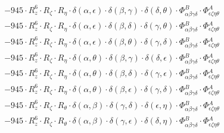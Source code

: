 \documentclass{article}
\begin{document}
\begin{equation}
\begin{array}{c}
 \\[0.2em] 		 - 945 \cdot R_{z}^{6} \cdot R_{\zeta{}} \cdot R_{\eta{}} \cdot \delta{}\left(\alpha{}, \epsilon{}\right) \cdot \delta{}\left(\beta{}, \gamma{}\right) \cdot \delta{}\left(\delta{}, \theta{}\right) \cdot \Phi{}^{B}_{\alpha{}\beta{}\gamma{}\delta{}} \cdot \Phi{}^{A}_{\epsilon{}\zeta{}\eta{}\theta{}} 
 \\[0.2em] 		 - 945 \cdot R_{z}^{6} \cdot R_{\zeta{}} \cdot R_{\eta{}} \cdot \delta{}\left(\alpha{}, \epsilon{}\right) \cdot \delta{}\left(\beta{}, \delta{}\right) \cdot \delta{}\left(\gamma{}, \theta{}\right) \cdot \Phi{}^{B}_{\alpha{}\beta{}\gamma{}\delta{}} \cdot \Phi{}^{A}_{\epsilon{}\zeta{}\eta{}\theta{}} 
 \\[0.2em] 		 - 945 \cdot R_{z}^{6} \cdot R_{\zeta{}} \cdot R_{\eta{}} \cdot \delta{}\left(\alpha{}, \epsilon{}\right) \cdot \delta{}\left(\beta{}, \theta{}\right) \cdot \delta{}\left(\gamma{}, \delta{}\right) \cdot \Phi{}^{B}_{\alpha{}\beta{}\gamma{}\delta{}} \cdot \Phi{}^{A}_{\epsilon{}\zeta{}\eta{}\theta{}} 
 \\[0.2em] 		 - 945 \cdot R_{z}^{6} \cdot R_{\zeta{}} \cdot R_{\eta{}} \cdot \delta{}\left(\alpha{}, \theta{}\right) \cdot \delta{}\left(\beta{}, \gamma{}\right) \cdot \delta{}\left(\delta{}, \epsilon{}\right) \cdot \Phi{}^{B}_{\alpha{}\beta{}\gamma{}\delta{}} \cdot \Phi{}^{A}_{\epsilon{}\zeta{}\eta{}\theta{}} 
 \\[0.2em] 		 - 945 \cdot R_{z}^{6} \cdot R_{\zeta{}} \cdot R_{\eta{}} \cdot \delta{}\left(\alpha{}, \theta{}\right) \cdot \delta{}\left(\beta{}, \delta{}\right) \cdot \delta{}\left(\gamma{}, \epsilon{}\right) \cdot \Phi{}^{B}_{\alpha{}\beta{}\gamma{}\delta{}} \cdot \Phi{}^{A}_{\epsilon{}\zeta{}\eta{}\theta{}} 
 \\[0.2em] 		 - 945 \cdot R_{z}^{6} \cdot R_{\zeta{}} \cdot R_{\eta{}} \cdot \delta{}\left(\alpha{}, \theta{}\right) \cdot \delta{}\left(\beta{}, \epsilon{}\right) \cdot \delta{}\left(\gamma{}, \delta{}\right) \cdot \Phi{}^{B}_{\alpha{}\beta{}\gamma{}\delta{}} \cdot \Phi{}^{A}_{\epsilon{}\zeta{}\eta{}\theta{}} 
 \\[0.2em] 		 - 945 \cdot R_{z}^{6} \cdot R_{\zeta{}} \cdot R_{\theta{}} \cdot \delta{}\left(\alpha{}, \beta{}\right) \cdot \delta{}\left(\gamma{}, \delta{}\right) \cdot \delta{}\left(\epsilon{}, \eta{}\right) \cdot \Phi{}^{B}_{\alpha{}\beta{}\gamma{}\delta{}} \cdot \Phi{}^{A}_{\epsilon{}\zeta{}\eta{}\theta{}} 
 \\[0.2em] 		 - 945 \cdot R_{z}^{6} \cdot R_{\zeta{}} \cdot R_{\theta{}} \cdot \delta{}\left(\alpha{}, \beta{}\right) \cdot \delta{}\left(\gamma{}, \epsilon{}\right) \cdot \delta{}\left(\delta{}, \eta{}\right) \cdot \Phi{}^{B}_{\alpha{}\beta{}\gamma{}\delta{}} \cdot \Phi{}^{A}_{\epsilon{}\zeta{}\eta{}\theta{}} 

\end{array}
\end{equation}
\end{document}
